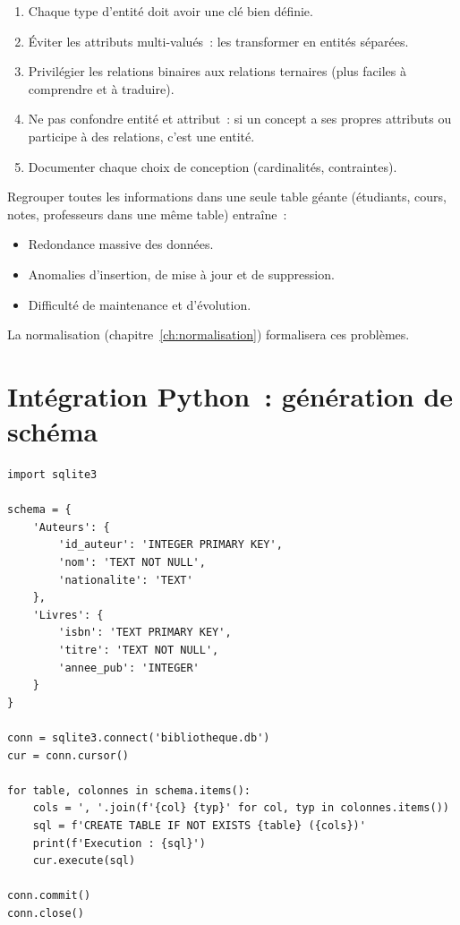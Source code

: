 \begin{bonnepratique}[title=\textbf{R\`egles d'or de la conception E/R}]
\begin{enumerate}
    \item Chaque type d'entit\'e doit avoir une cl\'e bien d\'efinie.
    \item \'Eviter les attributs multi-valu\'es~: les transformer en entit\'es s\'epar\'ees.
    \item Privil\'egier les relations binaires aux relations ternaires
          (plus faciles \`a comprendre et \`a traduire).
    \item Ne pas confondre entit\'e et attribut~: si un concept a ses propres
          attributs ou participe \`a des relations, c'est une entit\'e.
    \item Documenter chaque choix de conception (cardinalit\'es, contraintes).
\end{enumerate}
\end{bonnepratique}

\begin{antipattern}[title=\textbf{Anti-pattern~: la table ``fourre-tout''}]
Regrouper toutes les informations dans une seule table g\'eante
(\'etudiants, cours, notes, professeurs dans une m\^eme table) entra\^ine~:
\begin{itemize}
    \item Redondance massive des donn\'ees.
    \item Anomalies d'insertion, de mise \`a jour et de suppression.
    \item Difficult\'e de maintenance et d'\'evolution.
\end{itemize}
La normalisation (chapitre~\ref{ch:normalisation}) formalisera ces probl\`emes.
\end{antipattern}

\section{Int\'egration Python~: g\'en\'eration de sch\'ema}

\begin{codeblock}[title=\textbf{G\'en\'eration automatique du sch\'ema avec Python}]
\begin{verbatim}
import sqlite3

schema = {
    'Auteurs': {
        'id_auteur': 'INTEGER PRIMARY KEY',
        'nom': 'TEXT NOT NULL',
        'nationalite': 'TEXT'
    },
    'Livres': {
        'isbn': 'TEXT PRIMARY KEY',
        'titre': 'TEXT NOT NULL',
        'annee_pub': 'INTEGER'
    }
}

conn = sqlite3.connect('bibliotheque.db')
cur = conn.cursor()

for table, colonnes in schema.items():
    cols = ', '.join(f'{col} {typ}' for col, typ in colonnes.items())
    sql = f'CREATE TABLE IF NOT EXISTS {table} ({cols})'
    print(f'Execution : {sql}')
    cur.execute(sql)

conn.commit()
conn.close()
\end{verbatim}
\end{codeblock}

